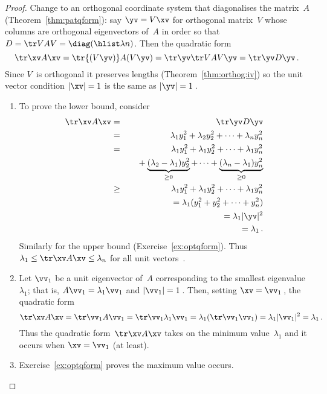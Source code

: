 \begin{proof} 
Change to an orthogonal coordinate system that diagonalises the matrix~\(A\) (Theorem~\ref{thm:patqform}): say \(\yv=V\xv\) for orthogonal matrix~\(V\) whose columns are orthogonal eigenvectors of~\(A\) in order so that \(D=\tr VAV=\diag(\hlist\lambda n)\).
Then the quadratic form 
\begin{equation*}
\tr\xv A\xv=\tr{(V\yv)} A(V\yv)=\tr\yv \tr VAV\yv=\tr\yv D\yv\,.
\end{equation*}
Since \(V\)~is orthogonal it preserves lengths (Theorem~\ref{thm:orthog:iv}) so the unit vector condition \(|\xv|=1\) is the same as \(|\yv|=1\)\,.
\begin{enumerate}
\item To prove the lower bound, consider
\begin{eqnarray*}
\tr\xv A\xv&=&\tr\yv D\yv
\\&=&\lambda_1y_1^2+\lambda_2y_2^2+\cdots+\lambda_ny_n^2
\\&=&\lambda_1y_1^2+\lambda_1y_2^2+\cdots+\lambda_1y_n^2
\\&&\quad{}
+\underbrace{(\lambda_2-\lambda_1)y_2^2}_{\geq0}
+\cdots+\underbrace{(\lambda_n-\lambda_1)y_n^2}_{\geq0}
\\&\geq&\lambda_1y_1^2+\lambda_1y_2^2+\cdots+\lambda_1y_n^2
\\&&{}=\lambda_1(y_1^2+y_2^2+\cdots+y_n^2)
\\&&{}=\lambda_1|\yv|^2
\\&&{}=\lambda_1\,.
\end{eqnarray*}
Similarly for the upper bound (Exercise~\ref{ex:optqform}).  
Thus \(\lambda_1\leq \tr\xv A\xv\leq\lambda_n\) for all unit vectors~\xv.

\item Let \(\vv_1\) be a unit eigenvector of~\(A\) corresponding to the smallest eigenvalue~\(\lambda_1\); that is, \(A\vv_1=\lambda_1\vv_1\) and \(|\vv_1|=1\)\,.
Then, setting \(\xv=\vv_1\)\,, the quadratic form
\begin{equation*}
\tr\xv A\xv=\tr\vv_1A\vv_1
=\tr\vv_1\lambda_1\vv_1
=\lambda_1(\tr\vv_1\vv_1)
=\lambda_1|\vv_1|^2
=\lambda_1\,.
\end{equation*}
Thus the quadratic form~\(\tr\xv A\xv\) takes on the minimum value~\(\lambda_1\) and it occurs when \(\xv=\vv_1\) (at least).

\item Exercise~\ref{ex:optqform} proves the maximum value occurs.
\end{enumerate}
\end{proof}




